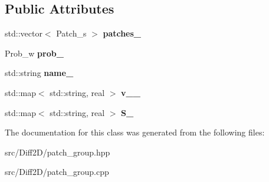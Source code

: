 \subsection*{Public Attributes}
\begin{DoxyCompactItemize}
\item 
\hypertarget{classPatch__Group_a637b27a0562076f78bf9b0698ac3609e}{
std::vector$<$ Patch\_\-s $>$ {\bfseries patches\_\-}}
\label{classPatch__Group_a637b27a0562076f78bf9b0698ac3609e}

\item 
\hypertarget{classPatch__Group_ac8d91a179d394f1d3d355d82ceb2dd2e}{
Prob\_\-w {\bfseries prob\_\-}}
\label{classPatch__Group_ac8d91a179d394f1d3d355d82ceb2dd2e}

\item 
\hypertarget{classPatch__Group_ac28afa5068ea65b91ce4d708f63c5a3a}{
std::string {\bfseries name\_\-}}
\label{classPatch__Group_ac28afa5068ea65b91ce4d708f63c5a3a}

\item 
\hypertarget{classPatch__Group_ae080e43ddd30ced473794b12a1cb3ccf}{
std::map$<$ std::string, real $>$ {\bfseries v\_\_\-}}
\label{classPatch__Group_ae080e43ddd30ced473794b12a1cb3ccf}

\item 
\hypertarget{classPatch__Group_aaad946bd88382b1e2e30cd1278632ace}{
std::map$<$ std::string, real $>$ {\bfseries S\_\-}}
\label{classPatch__Group_aaad946bd88382b1e2e30cd1278632ace}

\end{DoxyCompactItemize}


The documentation for this class was generated from the following files:\begin{DoxyCompactItemize}
\item 
src/Diff2D/patch\_\-group.hpp\item 
src/Diff2D/patch\_\-group.cpp\end{DoxyCompactItemize}
